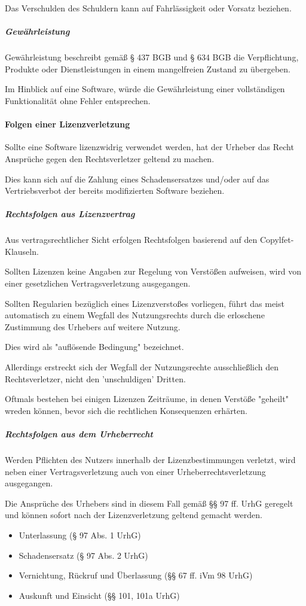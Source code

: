 Das Verschulden des Schuldern kann auf Fahrlässigkeit oder Vorsatz beziehen. 

\subparagraph{Gewährleistung}
Gewährleistung beschreibt gemäß § 437 BGB und § 634 BGB die Verpflichtung, Produkte oder Dienstleistungen in einem mangelfreien Zustand zu übergeben. 

Im Hinblick auf eine Software, würde die Gewährleistung einer vollständigen Funktionalität ohne Fehler entsprechen. 

\paragraph{Folgen einer Lizenzverletzung}
Sollte eine Software lizenzwidrig verwendet werden, hat der Urheber das Recht Ansprüche gegen den Rechtsverletzer geltend zu machen. 

Dies kann sich auf die Zahlung eines Schadensersatzes und/oder auf das Vertriebsverbot der bereits modifizierten Software beziehen. 

\subparagraph{Rechtsfolgen aus Lizenzvertrag}
Aus vertragsrechtlicher Sicht erfolgen Rechtsfolgen basierend auf den Copylfet-Klauseln. 

Sollten Lizenzen keine Angaben zur Regelung von Verstößen aufweisen, wird von einer gesetzlichen Vertragsverletzung ausgegangen. 

Sollten Regularien bezüglich eines Lizenzverstoßes vorliegen, führt das meist automatisch zu einem Wegfall des Nutzungsrechts durch die erloschene Zustimmung des Urhebers auf weitere Nutzung. 

Dies wird als "auflösende Bedingung" bezeichnet. 

Allerdings erstreckt sich der Wegfall der Nutzungsrechte ausschließlich den Rechtsverletzer, nicht den 'unschuldigen' Dritten. 

Oftmals bestehen bei einigen Lizenzen Zeiträume, in denen Verstöße "geheilt" wreden können, bevor sich die rechtlichen Konsequenzen erhärten. 

\subparagraph{Rechtsfolgen aus dem Urheberrecht}
Werden Pflichten des Nutzers innerhalb der Lizenzbestimmungen verletzt, wird neben einer Vertragsverletzung auch von einer Urheberrechtsverletzung ausgegangen. 

Die Ansprüche des Urhebers sind in diesem Fall gemäß §§ 97 ff. UrhG geregelt und können sofort nach der Lizenzverletzung geltend gemacht werden. 

\begin{itemize}
    \item Unterlassung (§ 97 Abs. 1 UrhG)
    \item Schadensersatz (§ 97 Abs. 2 UrhG)
    \item Vernichtung, Rückruf und Überlassung (§§ 67 ff. iVm 98 UrhG)
    \item Auskunft und Einsicht (§§ 101, 101a UrhG)
\end{itemize}

